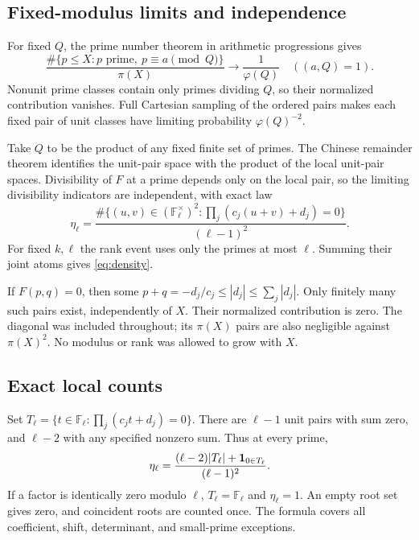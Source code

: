 \documentclass[11pt]{article}
\theoremstyle{definition}
\begin{document}
\subsection{Fixed-modulus limits and independence}
For fixed $Q$, the prime number theorem in arithmetic progressions gives
\[
 \frac{\#\{p\le X:p\text{ prime},\ p\equiv a\pmod Q\}}{\pi(X)}
       \longrightarrow\frac1{\varphi(Q)}\quad((a,Q)=1).
\]
Nonunit prime classes contain only primes dividing $Q$, so their
normalized contribution vanishes. Full Cartesian sampling of the
ordered pairs makes each fixed pair of unit classes have limiting
probability $\varphi(Q)^{-2}$.

Take $Q$ to be the product of any fixed finite set of primes.
The Chinese remainder theorem identifies the unit-pair space with
the product of the local unit-pair spaces. Divisibility of $F$
at a prime depends only on the local pair, so the limiting
divisibility indicators are independent, with exact law
\begin{equation}\label{eq:localcount}
 \eta_\ell=
 \frac{\#\{(u,v)\in(\mathbb F_\ell^\times)^2:
             \prod_j(c_j(u+v)+d_j)=0\}}{(\ell-1)^2}.
\end{equation}
For fixed $k,\ell$ the rank event uses only the primes at most
$\ell$. Summing their joint atoms gives \eqref{eq:density}.

If $F(p,q)=0$, then some $p+q=-d_j/c_j\le|d_j|
\le\sum_j|d_j|$. Only finitely many such pairs exist, independently
of $X$. Their normalized contribution is zero. The diagonal
was included throughout; its $\pi(X)$ pairs are also negligible
against $\pi(X)^2$. No modulus or rank was allowed to grow with $X$.

\subsection{Exact local counts}
Set $T_\ell=\{t\in\mathbb F_\ell:\prod_j(c_jt+d_j)=0\}$.
There are $\ell-1$ unit pairs with sum zero, and $\ell-2$
with any specified nonzero sum. Thus at every prime,
\begin{equation}\label{eq:rootcount}
 \eta_\ell=\frac{(\ell-2)|T_\ell|+
                    {\bf1}_{0\in T_\ell}}{(\ell-1)^2}.
\end{equation}
If a factor is identically zero modulo $\ell$,
$T_\ell=\mathbb F_\ell$ and $\eta_\ell=1$.
An empty root set gives zero, and coincident roots are counted
once. The formula covers all coefficient, shift, determinant,
and small-prime exceptions.
\end{document}
